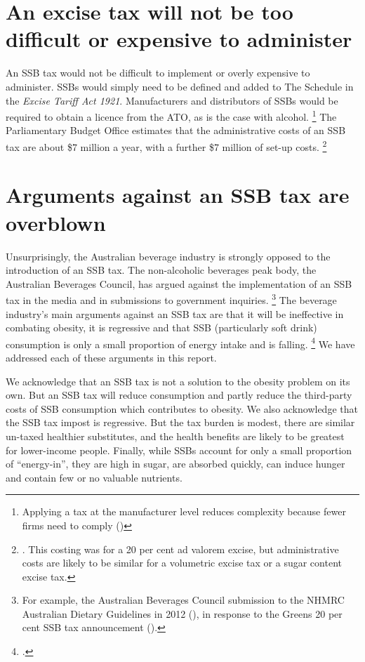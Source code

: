 \documentclass[embargoed]{grattan}
\begin{document}
\section{An excise tax will not be too difficult or expensive to administer}\label{an-excise-tax-will-not-be-too-difficult-or-expensive-to-administer}

An SSB tax would not be difficult to implement or overly expensive to administer.
SSBs would simply need to be defined and added to The Schedule in the \emph{Excise Tariff Act 1921}.
Manufacturers and distributors of SSBs would be required to obtain a licence from the ATO, as is the case with alcohol.%
\footnote{Applying a tax at the manufacturer level reduces complexity because fewer firms need to comply (\textcites{CnossenExcisetaxationAustralia}{Freebairn2010Taxationobesity})} The Parliamentary Budget Office estimates that the administrative costs of an SSB tax are about \$7 million a year, with a further \$7 million of set-up costs.%
\footnote{\textcite{Office2016PolicycostingAustralian}.
This costing was for a 20 per cent ad valorem excise, but administrative costs are likely to be similar for a volumetric excise tax or a sugar content excise tax.}


\section{Arguments against an SSB tax are overblown}\label{arguments-against-an-ssb-tax-are-overblown}

Unsurprisingly, the Australian beverage industry is strongly opposed to the introduction of an SSB tax.
The non-alcoholic beverages peak body, the Australian Beverages Council, has argued against the implementation of an SSB tax in the media and in submissions to government inquiries.%
\footnote{For example, the Australian Beverages Council submission to the NHMRC Australian Dietary Guidelines in 2012 (\textcite{Council2012AustralianBeveragesCouncil}), in response to the Greens 20 per cent SSB tax announcement (\textcite{Council2016Softdrinktax}).} The beverage industry's main arguments against an SSB tax are that it will be ineffective in combating obesity, it is regressive and that SSB (particularly soft drink) consumption is only a small proportion of energy intake and is falling.%
\footcite{Sharma2014effectstaxingsugarsweetened} We have addressed each of these arguments in this report. 

We acknowledge that an SSB tax is not a solution to the obesity problem on its own.
But an SSB tax will reduce consumption and partly reduce the third-party costs of SSB consumption which contributes to obesity.
We also acknowledge that the SSB tax impost is regressive.
But the tax burden is modest, there are similar un-taxed healthier substitutes, and the health benefits are likely to be greatest for lower-income people.
Finally, while SSBs account for only a small proportion of “energy-in”, they are high in sugar, are absorbed quickly, can induce hunger and contain few or no valuable nutrients.
\end{document}
